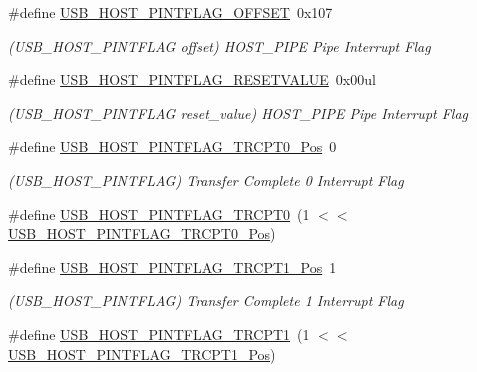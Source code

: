 \begin{DoxyCompactItemize}
\#define \mbox{\hyperlink{group___s_a_m_d21___u_s_b_gabde50c13998aefad803aa1bc5bb632ca}{U\+S\+B\+\_\+\+H\+O\+S\+T\+\_\+\+P\+I\+N\+T\+F\+L\+A\+G\+\_\+\+O\+F\+F\+S\+ET}}~0x107
\begin{DoxyCompactList}\small\item\em (U\+S\+B\+\_\+\+H\+O\+S\+T\+\_\+\+P\+I\+N\+T\+F\+L\+AG offset) H\+O\+S\+T\+\_\+\+P\+I\+PE Pipe Interrupt Flag \end{DoxyCompactList}\item 
\#define \mbox{\hyperlink{group___s_a_m_d21___u_s_b_ga380c80e8759c1b60946f0aaa79272179}{U\+S\+B\+\_\+\+H\+O\+S\+T\+\_\+\+P\+I\+N\+T\+F\+L\+A\+G\+\_\+\+R\+E\+S\+E\+T\+V\+A\+L\+UE}}~0x00ul
\begin{DoxyCompactList}\small\item\em (U\+S\+B\+\_\+\+H\+O\+S\+T\+\_\+\+P\+I\+N\+T\+F\+L\+AG reset\+\_\+value) H\+O\+S\+T\+\_\+\+P\+I\+PE Pipe Interrupt Flag \end{DoxyCompactList}\item 
\#define \mbox{\hyperlink{group___s_a_m_d21___u_s_b_ga49eea3cf8bffb9a21f866b05df261edc}{U\+S\+B\+\_\+\+H\+O\+S\+T\+\_\+\+P\+I\+N\+T\+F\+L\+A\+G\+\_\+\+T\+R\+C\+P\+T0\+\_\+\+Pos}}~0
\begin{DoxyCompactList}\small\item\em (U\+S\+B\+\_\+\+H\+O\+S\+T\+\_\+\+P\+I\+N\+T\+F\+L\+AG) Transfer Complete 0 Interrupt Flag \end{DoxyCompactList}\item 
\#define \mbox{\hyperlink{group___s_a_m_d21___u_s_b_ga88bb715ba11624f1e63da9985255348b}{U\+S\+B\+\_\+\+H\+O\+S\+T\+\_\+\+P\+I\+N\+T\+F\+L\+A\+G\+\_\+\+T\+R\+C\+P\+T0}}~(1 $<$$<$ \mbox{\hyperlink{group___s_a_m_d21___u_s_b_ga49eea3cf8bffb9a21f866b05df261edc}{U\+S\+B\+\_\+\+H\+O\+S\+T\+\_\+\+P\+I\+N\+T\+F\+L\+A\+G\+\_\+\+T\+R\+C\+P\+T0\+\_\+\+Pos}})
\item 
\#define \mbox{\hyperlink{group___s_a_m_d21___u_s_b_ga9d706438e9726dbfadf6e4497d3cb000}{U\+S\+B\+\_\+\+H\+O\+S\+T\+\_\+\+P\+I\+N\+T\+F\+L\+A\+G\+\_\+\+T\+R\+C\+P\+T1\+\_\+\+Pos}}~1
\begin{DoxyCompactList}\small\item\em (U\+S\+B\+\_\+\+H\+O\+S\+T\+\_\+\+P\+I\+N\+T\+F\+L\+AG) Transfer Complete 1 Interrupt Flag \end{DoxyCompactList}\item 
\#define \mbox{\hyperlink{group___s_a_m_d21___u_s_b_ga2f2ed8958e23fcf241d5f7aad7f43849}{U\+S\+B\+\_\+\+H\+O\+S\+T\+\_\+\+P\+I\+N\+T\+F\+L\+A\+G\+\_\+\+T\+R\+C\+P\+T1}}~(1 $<$$<$ \mbox{\hyperlink{group___s_a_m_d21___u_s_b_ga9d706438e9726dbfadf6e4497d3cb000}{U\+S\+B\+\_\+\+H\+O\+S\+T\+\_\+\+P\+I\+N\+T\+F\+L\+A\+G\+\_\+\+T\+R\+C\+P\+T1\+\_\+\+Pos}})

\end{DoxyCompactItemize}
